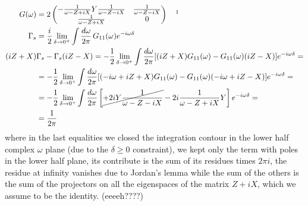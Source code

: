 \documentclass[a4paper,11pt]{article}
\theoremstyle{remark}
\newcommand{\np}{\vskip 1.3cm}
\begin{document}
  \begin{align*}
   G(\omega)&=2\begin{pmatrix}
              -\frac{1}{\omega -Z+iX}Y\frac{1}{\omega -Z-iX} & \frac{1}{\omega -Z-iX}  \\
               \frac{1}{\omega -Z+iX} & 0
             \end{pmatrix}\quad\text{\footnotemark }\\
  \Gamma_s&=\frac{i}{2}\lim_{\delta\to0^+}\int\frac{d\omega}{2\pi}\,G_{11}(\omega)e^{-i\omega\delta}\\
  (iZ+X)&\Gamma_s-\Gamma_s(iZ-X) = -\frac{1}{2}\lim_{\delta\to0^+}\int\frac{d\omega}{2\pi} [(iZ+X)G_{11}(\omega)-G_{11}(\omega)(iZ-X)]e^{-i\omega\delta}=\\
  &=-\frac{1}{2}\lim_{\delta\to0^+}\int\frac{d\omega}{2\pi} [(-i\omega+iZ+X)G_{11}(\omega)-G_{11}(\omega)(-i\omega+iZ-X)]e^{-i\omega\delta}=\\
  &=-\frac{1}{2}\lim_{\delta\to0^+}\int\frac{d\omega}{2\pi} \left[\cancel{+2iY\frac{1}{\omega -Z-iX}} - 2i\frac{1}{\omega-Z+iX}Y\right]e^{-i\omega\delta}=\\
  &=\frac{1}{2\pi}
  \end{align*}
  where in the last equalities we closed the integration contour in the lower half complex $\omega$ plane (due to the $\delta\geq0$ constraint), we kept only the term with poles in the lower half plane, its contribute is the sum of its residues times $2\pi i$, the residue at infinity vanishes due to Jordan's lemma while the sum of the others is the sum of the projectors on all the eigenspaces of the matrix $Z+iX$, which we assume to be the identity. (eeeeh????)

  \np
  
  
  
 \appendix
\end{document}
